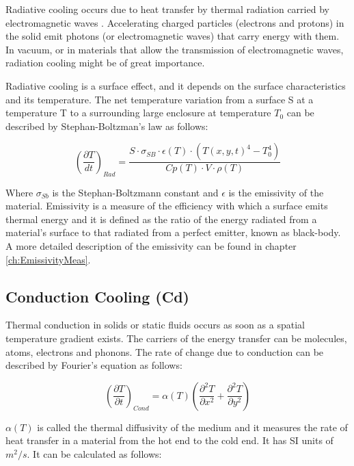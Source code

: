 Radiative cooling occurs due to heat transfer by thermal radiation carried by electromagnetic waves \parencite[][]{ref:RadiativeCooling}. Accelerating charged particles (electrons and protons) in the solid emit photons (or electromagnetic waves) that carry energy with them. In vacuum,  or in materials that allow the transmission of electromagnetic waves, radiation cooling might be of great importance. 

Radiative cooling is a surface effect, and it depends on the surface characteristics and its temperature.  The net temperature variation from a surface S at a temperature T to a surrounding large enclosure at temperature $T_0$ can be described by Stephan-Boltzman's law as follows: 

\begin{equation}
    \left( \frac{\partial T}{dt} \right)_{Rad} = \frac{S\cdot \sigma_{SB}\cdot \epsilon(T)\cdot \left(T(x,y,t)^4 - T_0^4\right)}{Cp(T)\cdot V \cdot \rho(T)}
\end{equation}

Where $\sigma_{Sb}$ is the Stephan-Boltzmann constant and $\epsilon$ is the emissivity of the material. Emissivity is a measure of the efficiency with which a surface emits thermal energy and it is defined as the ratio of the energy radiated from a material's surface to that radiated from a perfect emitter, known as black-body. A more detailed description of the emissivity can be found in chapter \ref{ch:EmissivityMeas}. 

\subsection{Conduction Cooling (Cd)}

Thermal conduction in solids or static fluids \parencite[][]{ref:ConductionCooling} occurs as soon as a spatial temperature gradient exists. The carriers of the energy transfer can be molecules, atoms, electrons and phonons. The rate of change due to conduction can be described by Fourier's equation as follows: 

\begin{equation}
    \left( \frac{\partial T}{\partial t} \right)_{Cond} = \alpha (T) \left( \frac{\partial^2 T}{\partial x^2} + \frac{\partial^2 T}{\partial y^2} \right)
\end{equation}

$\alpha(T)$ is called the thermal diffusivity of the medium and it measures the rate of heat transfer in a material from the hot end to the cold end. It has SI units of $m^2 /s$. It can be calculated as follows: 

